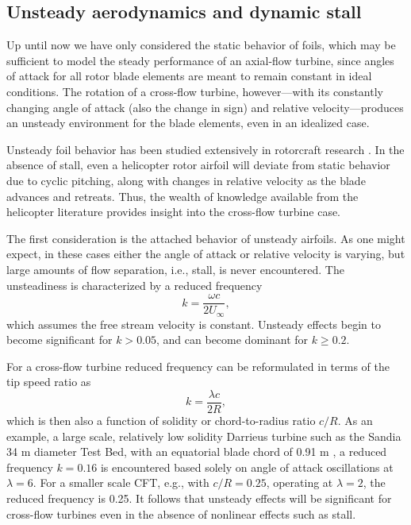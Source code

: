 \subsection{Unsteady aerodynamics and dynamic stall}

Up until now we have only considered the static behavior of foils, which may be
sufficient to model the steady performance of an axial-flow turbine, since
angles of attack for all rotor blade elements are meant to remain constant in
ideal conditions. The rotation of a cross-flow turbine, however---with its
constantly changing angle of attack (also the change in sign) and relative
velocity---produces an unsteady environment for the blade elements, even in an
idealized case.

Unsteady foil behavior has been studied extensively in rotorcraft research
\cite{Leishman2006}. In the absence of stall, even a helicopter rotor airfoil
will deviate from static behavior due to cyclic pitching, along with changes in
relative velocity as the blade advances and retreats. Thus, the wealth of
knowledge available from the helicopter literature provides insight into the
cross-flow turbine case.

The first consideration is the attached behavior of unsteady airfoils. As one
might expect, in these cases either the angle of attack or relative velocity is
varying, but large amounts of flow separation, i.e., stall, is never
encountered. The unsteadiness is characterized by a reduced
frequency~\cite{Leishman2006}
\begin{equation}
    k = \frac{\omega c}{2 U_\infty},
\end{equation}
which assumes the free stream velocity is constant. Unsteady effects begin to
become significant for $k > 0.05$, and can become dominant for $k \ge 0.2$.


For a cross-flow turbine reduced frequency can be reformulated in terms of the
tip speed ratio as
\begin{equation}
    k = \frac{\lambda c}{2R},
\end{equation}
which is then also a function of solidity or chord-to-radius ratio $c/R$. As an
example, a large scale, relatively low solidity Darrieus turbine such as the
Sandia 34 m diameter Test Bed, with an equatorial blade chord of 0.91 m
\cite{Murray2011}, a reduced frequency $k=0.16$ is encountered based solely on
angle of attack oscillations at $\lambda=6$. For a smaller scale CFT, e.g., with
$c/R = 0.25$, operating at $\lambda = 2$, the reduced frequency is 0.25. It
follows that unsteady effects will be significant for cross-flow turbines even
in the absence of nonlinear effects such as stall.

